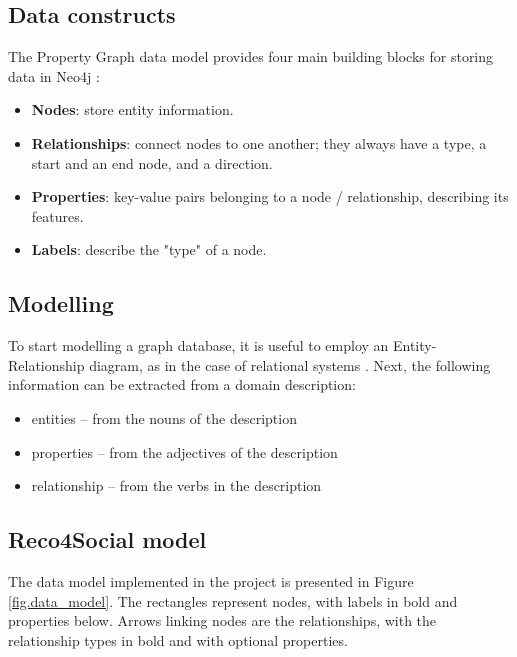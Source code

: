 \documentclass[12pt]{report}
\begin{document}
\subsection{Data constructs}

The Property Graph data model provides four main building blocks for storing data in Neo4j \cite{learning_neo4j}:
\begin{itemize}
\item {\bf Nodes}: store entity information.
\item {\bf Relationships}: connect nodes to one another; they always have a type, a start and an end node, and a direction.
\item {\bf Properties}: key-value pairs belonging to a node / relationship, describing its features.
\item {\bf Labels}: describe the "type" of a node.
\end{itemize}

\subsection{Modelling}

To start modelling a graph database, it is useful to employ an Entity-Relationship diagram, as in the case of relational systems \cite{learning_neo4j}. Next, the following information can be extracted from a domain description:
\begin{itemize}
\item entities -- from the nouns of the description
\item properties -- from the adjectives of the description
\item relationship -- from the verbs in the description
\end{itemize}



\subsection{Reco4Social model}

The data model implemented in the project is presented in Figure \ref{fig.data_model}. The rectangles represent nodes, with labels in bold and properties below. Arrows linking nodes are the relationships, with the relationship types in bold and with optional properties.
\end{document}
